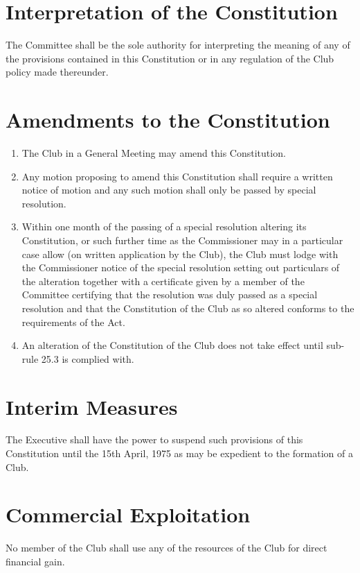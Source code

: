 \documentclass[11pt]{article} %
\begin{document}
\section{Interpretation of the Constitution}
The Committee shall be the sole authority for interpreting the meaning of any of the provisions contained in this Constitution or in any regulation of the Club policy made thereunder.

\section{Amendments to the Constitution}
\begin{enumerate}
	\item The Club in a General Meeting may amend this Constitution.
	\item Any motion proposing to amend this Constitution shall require a written notice of motion and any such motion shall only be passed by special resolution.
	\item Within one month of the passing of a special resolution altering its Constitution, or such further time as the Commissioner may in a particular case allow (on written application by the Club), the Club must lodge with the Commissioner notice of the special resolution setting out particulars of the alteration together with a certificate given by a member of the Committee certifying that the resolution was duly passed as a special resolution and that the Constitution of the Club as so altered conforms to the requirements of the Act.
	\item An alteration of the Constitution of the Club does not take effect until sub-rule 25.3 is complied with.
\end{enumerate}

\section{Interim Measures}
The Executive shall have the power to suspend such provisions of this Constitution until the 15th April, 1975 as may be expedient to the formation of a Club.\\

\section{Commercial Exploitation}
No member of the Club shall use any of the resources of the Club for direct financial gain.
\end{document}
